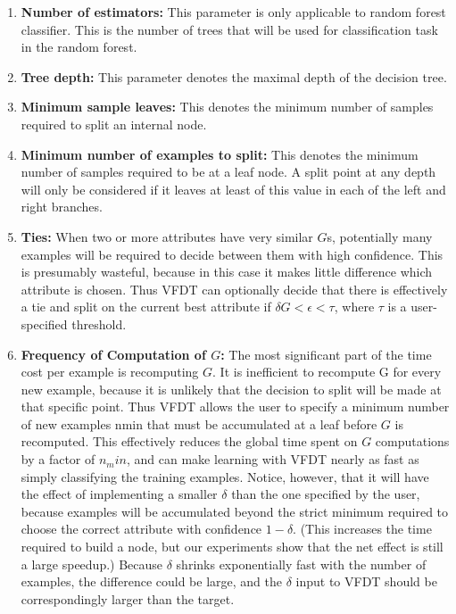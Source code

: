 \documentclass[sigplan]{acmart}\settopmatter{printfolios=true,printccs=false,printacmref=false}
\begin{document}
\begin{enumerate}
	\item \textbf{Number of estimators: } This parameter is only applicable to random forest classifier. This is the number of trees that will be used for classification task in the random forest. 
	\item \textbf{Tree depth: } This parameter denotes the maximal depth of the decision tree.
	\item \textbf{Minimum sample leaves: } This denotes the minimum number of samples required to split an internal node.
	\item \textbf{Minimum number of examples to split: } This denotes the minimum number of samples required to be at a leaf node. A split point at any depth will only be considered if it leaves at least of this value in each of the left and right branches.
	\item \textbf{Ties: } When two or more attributes have very similar $G$s, potentially many examples will be required to decide between them with high confidence. This is presumably wasteful, because in this case it makes little difference which attribute is chosen. Thus VFDT can optionally decide that there is effectively a tie and split on the current best attribute if $\delta G < \epsilon < \tau$, where $\tau$ is a user-specified threshold.
	\item \textbf{Frequency of Computation of $G$: } The most significant part of the time cost per example is recomputing $G$. It is inefficient to recompute G for every new example, because it is unlikely that the decision to split will be made at that specific point. Thus VFDT allows the user to specify a minimum number of new examples nmin that must be accumulated at a leaf before $G$ is recomputed. This effectively reduces the global time spent on $G$ computations by a factor of $n_min$, and can make learning with VFDT nearly as fast as simply classifying the training examples. Notice, however, that it will have the effect of implementing a smaller $\delta$ than the one specified by the user, because examples will be accumulated beyond the strict minimum required to choose the correct attribute with confidence $1 - \delta$. (This increases the time required to build a node, but our experiments show that the net effect is still a large speedup.) Because $\delta$ shrinks exponentially fast with the number of examples, the difference could be large, and the $\delta$ input to VFDT should be correspondingly larger than the target.
\end{enumerate}
\end{document}
